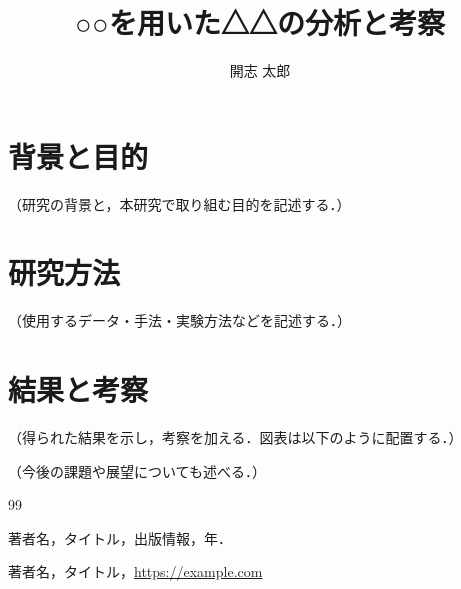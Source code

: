 \documentclass[platex,dvipdfmx,a4paper,11pt,twocolumn]{jsarticle}
\title{○○を用いた△△の分析と考察}
\author{開志 太郎}
\begin{document}
\maketitle
\thispagestyle{fancy}
\fontsize{11pt}{14pt}\selectfont

\section{背景と目的}

（研究の背景と，本研究で取り組む目的を記述する．）

\section{研究方法}

（使用するデータ・手法・実験方法などを記述する．）

\section{結果と考察}

（得られた結果を示し，考察を加える．図表は以下のように配置する．）


（今後の課題や展望についても述べる．）

\begin{thebibliography}{99}
  \fontsize{11pt}{11pt}\selectfont

  著者名，タイトル，出版情報，年．

  著者名，タイトル，\url{https://example.com}

\end{thebibliography}
\end{document}

